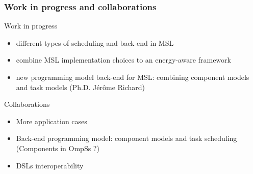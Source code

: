 \documentclass{beamer}
\makeatletter
\newenvironment{withoutheadline}{
        \setbeamertemplate{headline}[default]
        \def\beamer@entrycode{\vspace*{-\headheight}}
    }{}
\makeatother
\begin{document}

\begin{frame}
\frametitle{Work in progress and collaborations}
\begin{block}{Work in progress}
\begin{itemize}
\item different types of scheduling and back-end in MSL
\item combine MSL implementation choices to an energy-aware framework
\item new programming model back-end for MSL: combining component models and task models (Ph.D. Jérôme Richard)
\end{itemize}
\end{block}
\begin{block}{Collaborations}
\begin{itemize}
\item More application cases
\item Back-end programming model: component models and task scheduling (Components in OmpSs ?)
\item DSLs interoperability
\end{itemize}
\end{block}
\end{frame}

\end{document}
